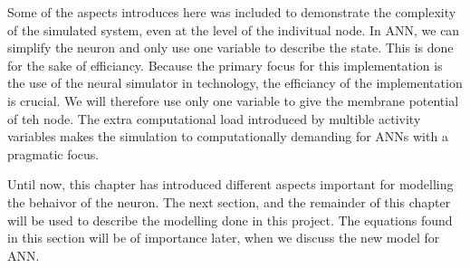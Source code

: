 Some of the aspects introduces here was included to demonstrate the complexity of the simulated system, even at the level of the indivitual node.
In ANN, we can simplify the neuron and only use one variable to describe the state. 
This is done for the sake of efficiancy.
Because the primary focus for this implementation is the use of the neural simulator in technology, the efficiancy of the implementation is crucial. 
We will therefore use only one variable to give the membrane potential of teh node.
The extra computational load introduced by multible activity variables makes the simulation to computationally demanding for ANNs with a pragmatic focus. 






Until now, this chapter has introduced different aspects important for modelling the behaivor of the neuron.
The next section, and the remainder of this chapter will be used to describe the modelling done in this project.
The equations found in this section will be of importance later, when we discuss the new model for ANN.


%


